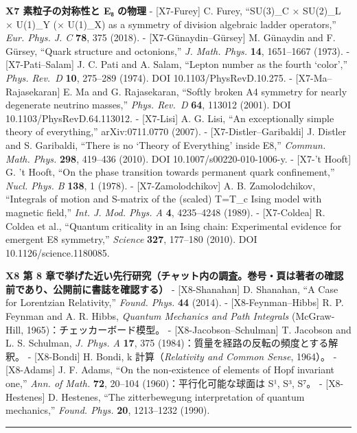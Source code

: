 \documentclass[
  a4paper,
]{ltjsarticle}
\begin{document}
\textbf{X7 素粒子の対称性と E₈ の物理} - {[}X7-Furey{]} C. Furey,
``SU(3)\_C × SU(2)\_L × U(1)\_Y (× U(1)\_X) as a symmetry of division
algebraic ladder operators,'' \emph{Eur. Phys. J. C} \textbf{78}, 375
(2018). - {[}X7-Günaydin--Gürsey{]} M. Günaydin and F. Gürsey, ``Quark
structure and octonions,'' \emph{J. Math. Phys.} \textbf{14}, 1651--1667
(1973). - {[}X7-Pati--Salam{]} J. C. Pati and A. Salam, ``Lepton number
as the fourth `color','' \emph{Phys. Rev.~D} \textbf{10}, 275--289
(1974). DOI 10.1103/PhysRevD.10.275. - {[}X7-Ma--Rajasekaran{]} E. Ma
and G. Rajasekaran, ``Softly broken A4 symmetry for nearly degenerate
neutrino masses,'' \emph{Phys. Rev.~D} \textbf{64}, 113012 (2001). DOI
10.1103/PhysRevD.64.113012. - {[}X7-Lisi{]} A. G. Lisi, ``An
exceptionally simple theory of everything,'' arXiv:0711.0770 (2007). -
{[}X7-Distler--Garibaldi{]} J. Distler and S. Garibaldi, ``There is no
`Theory of Everything' inside E8,'' \emph{Commun. Math. Phys.}
\textbf{298}, 419--436 (2010). DOI 10.1007/s00220-010-1006-y. - {[}X7-'t
Hooft{]} G. 't Hooft, ``On the phase transition towards permanent quark
confinement,'' \emph{Nucl. Phys. B} \textbf{138}, 1 (1978). -
{[}X7-Zamolodchikov{]} A. B. Zamolodchikov, ``Integrals of motion and
S-matrix of the (scaled) T=T\_c Ising model with magnetic field,''
\emph{Int. J. Mod. Phys. A} \textbf{4}, 4235--4248 (1989). -
{[}X7-Coldea{]} R. Coldea et al., ``Quantum criticality in an Ising
chain: Experimental evidence for emergent E8 symmetry,'' \emph{Science}
\textbf{327}, 177--180 (2010). DOI 10.1126/science.1180085.

\textbf{X8 第 8
章で挙げた近い先行研究（チャット内の調査。巻号・頁は著者の確認前であり、公開前に書誌を確認する）}
- {[}X8-Shanahan{]} D. Shanahan, ``A Case for Lorentzian Relativity,''
\emph{Found. Phys.} \textbf{44} (2014). - {[}X8-Feynman--Hibbs{]} R. P.
Feynman and A. R. Hibbs, \emph{Quantum Mechanics and Path Integrals}
(McGraw-Hill, 1965)：チェッカーボード模型。 -
{[}X8-Jacobson--Schulman{]} T. Jacobson and L. S. Schulman, \emph{J.
Phys. A} \textbf{17}, 375 (1984)：質量を経路の反転の頻度とする解釈。 -
{[}X8-Bondi{]} H. Bondi, k 計算（\emph{Relativity and Common Sense},
1964）。 - {[}X8-Adams{]} J. F. Adams, ``On the non-existence of
elements of Hopf invariant one,'' \emph{Ann. of Math.} \textbf{72},
20--104 (1960)：平行化可能な球面は S¹, S³, S⁷。 - {[}X8-Hestenes{]} D.
Hestenes, ``The zitterbewegung interpretation of quantum mechanics,''
\emph{Found. Phys.} \textbf{20}, 1213--1232 (1990).

\begin{center}\rule{0.5\linewidth}{0.5pt}\end{center}
\end{document}
